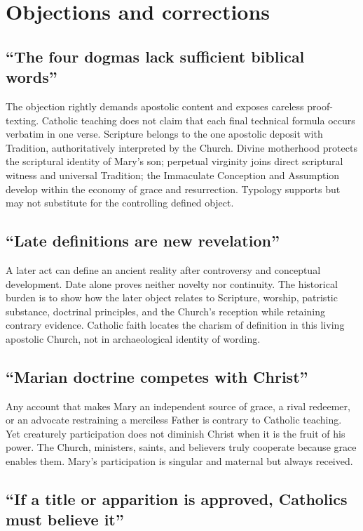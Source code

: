 \section{Objections and corrections}

\subsection{``The four dogmas lack sufficient biblical words''}

The objection rightly demands apostolic content and exposes careless
proof-texting. Catholic teaching does not claim that each final technical
formula occurs verbatim in one verse. Scripture belongs to the one apostolic
deposit with Tradition, authoritatively interpreted by the Church. Divine
motherhood protects the scriptural identity of Mary's son; perpetual virginity
joins direct scriptural witness and universal Tradition; the Immaculate
Conception and Assumption develop within the economy of grace and resurrection.
Typology supports but may not substitute for the controlling defined object.

\subsection{``Late definitions are new revelation''}

A later act can define an ancient reality after controversy and conceptual
development. Date alone proves neither novelty nor continuity. The historical
burden is to show how the later object relates to Scripture, worship,
patristic substance, doctrinal principles, and the Church's reception while
retaining contrary evidence. Catholic faith locates the charism of definition
in this living apostolic Church, not in archaeological identity of wording.

\subsection{``Marian doctrine competes with Christ''}

Any account that makes Mary an independent source of grace, a rival redeemer,
or an advocate restraining a merciless Father is contrary to Catholic
teaching. Yet creaturely participation does not diminish Christ when it is the
fruit of his power. The Church, ministers, saints, and believers truly
cooperate because grace enables them. Mary's participation is singular and
maternal but always received.

\subsection{``If a title or apparition is approved, Catholics must believe
it''}

